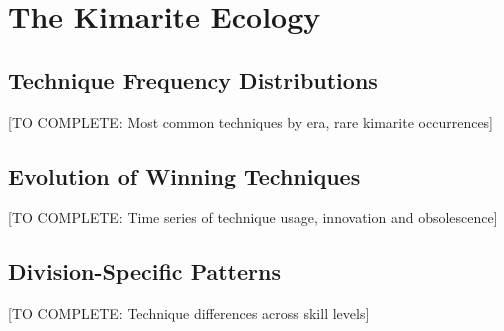 \section{The Kimarite Ecology}

\subsection{Technique Frequency Distributions}

[TO COMPLETE: Most common techniques by era, rare kimarite occurrences]

\subsection{Evolution of Winning Techniques}

[TO COMPLETE: Time series of technique usage, innovation and obsolescence]

\subsection{Division-Specific Patterns}

[TO COMPLETE: Technique differences across skill levels]